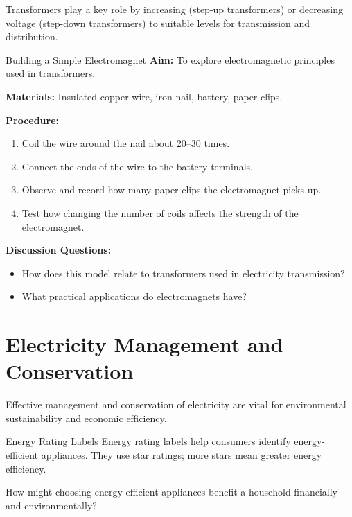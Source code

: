 Transformers play a key role by increasing (step-up transformers) or decreasing voltage (step-down transformers) to suitable levels for transmission and distribution.

\begin{investigation}{Building a Simple Electromagnet}
\textbf{Aim:} To explore electromagnetic principles used in transformers.

\textbf{Materials:} Insulated copper wire, iron nail, battery, paper clips.

\textbf{Procedure:}
\begin{enumerate}
    \item Coil the wire around the nail about 20–30 times.
    \item Connect the ends of the wire to the battery terminals.
    \item Observe and record how many paper clips the electromagnet picks up.
    \item Test how changing the number of coils affects the strength of the electromagnet.
\end{enumerate}

\textbf{Discussion Questions:}
\begin{itemize}
    \item How does this model relate to transformers used in electricity transmission?
    \item What practical applications do electromagnets have?
\end{itemize}
\end{investigation}

\section{Electricity Management and Conservation}

Effective management and conservation of electricity are vital for environmental sustainability and economic efficiency.

\begin{keyconcept}{Energy Rating Labels}
Energy rating labels help consumers identify energy-efficient appliances. They use star ratings; more stars mean greater energy efficiency.
\end{keyconcept}

\begin{stopandthink}
How might choosing energy-efficient appliances benefit a household financially and environmentally?
\end{stopandthink}

